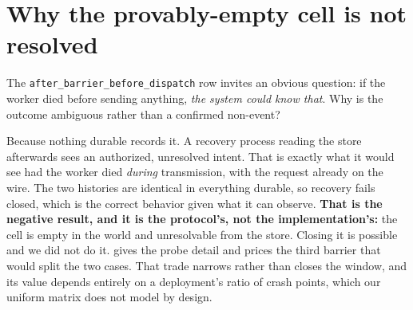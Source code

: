 \documentclass[10pt,journal,compsoc]{IEEEtran}
\begin{document}
\section{Why the provably-empty cell is not resolved}
\label{supp:provable-detail}

The \texttt{after\_barrier\_before\_dispatch} row invites an obvious question:
if the worker died before sending anything, \emph{the system could know that}.
Why is the outcome ambiguous rather than a confirmed non-event?

Because nothing durable records it. A recovery process reading the store
afterwards sees an authorized, unresolved intent. That is exactly what it would
see had the worker died \emph{during} transmission, with the request already on
the wire. The two histories are identical in everything durable, so recovery
fails closed, which is the correct behavior given what it can observe.
\textbf{That is the negative result, and it is the protocol's, not the
implementation's:} the cell is empty in the world and unresolvable from the
store. Closing it is possible and we did not do it.  gives
the probe detail and prices the third barrier that would split the two
cases. That trade narrows rather than closes the window, and its value depends
entirely on a deployment's ratio of crash points, which our uniform matrix does
not model by design.

%


\end{document}
